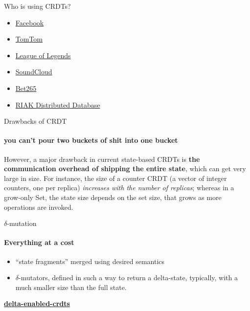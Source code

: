 \documentclass{beamer}
\begin{document}
\begin{frame}{Who is using CRDTs?}
\begin{itemize}
	\item \href{https://dzone.com/articles/facebook-announces-apollo-qcon}{Facebook}
	\item \href{https://speakerdeck.com/ajantis/practical-demystification-of-crdts}{TomTom}
	\item \href{http://highscalability.com/blog/2014/10/13/how-league-of-legends-scaled-chat-to-70-million-players-it-t.html}{League of Legends}
	\item \href{https://developers.soundcloud.com/blog/roshi-a-crdt-system-for-timestamped-events}{SoundCloud}
	\item \href{http://www.erlang-factory.com/static/upload/media/1434558446558020erlanguserconference2015bet365michaelowen.pdf}{Bet265}
	\item \href{http://docs.basho.com/riak/kv/2.2.3/developing/data-types/}{RIAK Distributed Database}
\end{itemize}
\end{frame}


\begin{frame}{Drawbacks of CRDT}
\framesubtitle{you can't pour two buckets of shit into one bucket}
However, a major drawback in current state-based CRDTs is \textbf{the communication overhead of shipping the entire state}, which can get very large in size. For instance, the size of a counter CRDT (a vector of integer counters, one per replica) \textit{increases with the number of replicas}; whereas in a grow-only Set, the state size depends on the set size, that grows as more operations are invoked.
\end{frame}

\begin{frame}{$\delta$-mutation}
\framesubtitle{Everything at a cost}

\begin{itemize}
	\item “state fragments” merged using desired semantics
	\item ${\delta}$-mutators, defined in such a way to return a delta-state, typically, with a much smaller size than the full state.
\end{itemize}

\center
\textbf{\href{https://github.com/CBaquero/delta-enabled-crdts}{delta-enabled-crdts}} 
\end{frame}
\end{document}
